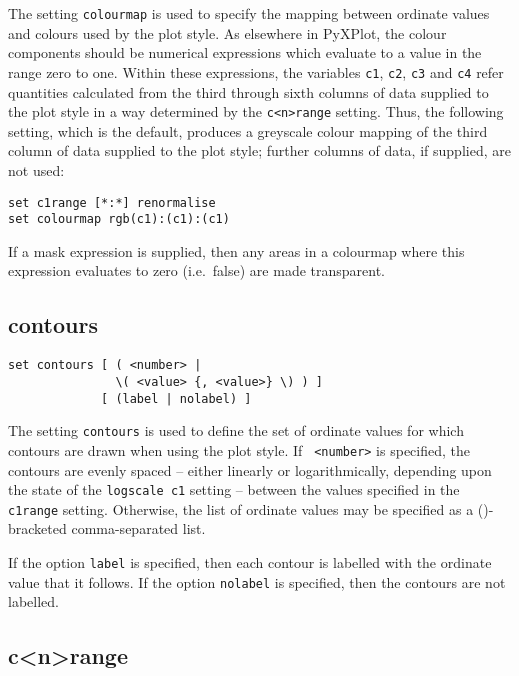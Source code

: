 The setting {\tt colourmap} is used to specify the mapping between ordinate
values and colours used by the  plot style. As elsewhere in
PyXPlot, the colour components should be numerical expressions which evaluate
to a value in the range zero to one. Within these expressions, the variables
{\tt c1}, {\tt c2}, {\tt c3} and {\tt c4} refer quantities calculated from the
third through sixth columns of data supplied to the  plot
style in a way determined by the {\tt c<n>range} setting.  Thus, the following
setting, which is the default, produces a greyscale colour mapping of the third
column of data supplied to the  plot style; further columns
of data, if supplied, are not used:

\begin{verbatim}
set c1range [*:*] renormalise
set colourmap rgb(c1):(c1):(c1)
\end{verbatim}

If a mask expression is supplied, then any areas in a colourmap where this
expression evaluates to zero (i.e.\ false) are made transparent.


\subsection{contours}

\begin{verbatim}
set contours [ ( <number> |
               \( <value> {, <value>} \) ) ]
             [ (label | nolabel) ]
\end{verbatim}

The setting {\tt contours} is used to define the set of ordinate values for
which contours are drawn when using the  plot style. If {\tt
<number>} is specified, the contours are evenly spaced -- either linearly or
logarithmically, depending upon the state of the {\tt logscale c1} setting --
between the values specified in the {\tt c1range} setting. Otherwise, the list
of ordinate values may be specified as a ()-bracketed comma-separated list.

If the option {\tt label} is specified, then each contour is labelled with the
ordinate value that it follows. If the option {\tt nolabel} is specified, then
the contours are not labelled.


\subsection{c<n>range}

